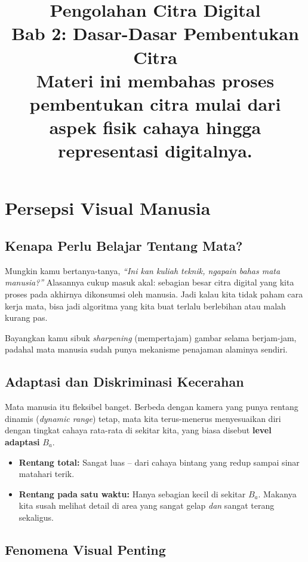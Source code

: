 \documentclass[12pt,a4paper]{article}
\title{
  {\LARGE\bfseries Pengolahan Citra Digital}\\[0.5em]
  {\large Bab 2: Dasar-Dasar Pembentukan Citra}\\[0.8em]
  {\normalsize Materi ini membahas proses pembentukan citra mulai dari aspek fisik cahaya hingga representasi digitalnya.}
}
\author{}
\date{}
\begin{document}
\maketitle
\thispagestyle{fancy}
\tableofcontents
\newpage
 
\section{Persepsi Visual Manusia}
\label{sec:visual}
 
\subsection{Kenapa Perlu Belajar Tentang Mata?}
 
Mungkin kamu bertanya-tanya, \textit{``Ini kan kuliah teknik, ngapain bahas mata manusia?''}
Alasannya cukup masuk akal: sebagian besar citra digital yang kita proses pada akhirnya
dikonsumsi oleh manusia. Jadi kalau kita tidak paham cara kerja mata, bisa jadi algoritma
yang kita buat terlalu berlebihan atau malah kurang pas.
 
Bayangkan kamu sibuk \textit{sharpening} (mempertajam) gambar selama berjam-jam, padahal
mata manusia sudah punya mekanisme penajaman alaminya sendiri.
 
\subsection{Adaptasi dan Diskriminasi Kecerahan}
 
Mata manusia itu fleksibel banget. Berbeda dengan kamera yang punya rentang dinamis
(\textit{dynamic range}) tetap, mata kita terus-menerus menyesuaikan diri dengan tingkat
cahaya rata-rata di sekitar kita, yang biasa disebut \textbf{level adaptasi} $B_a$.
 
\begin{itemize}[leftmargin=*]
  \item \textbf{Rentang total:} Sangat luas -- dari cahaya bintang yang redup sampai
        sinar matahari terik.
  \item \textbf{Rentang pada satu waktu:} Hanya sebagian kecil di sekitar $B_a$. Makanya
        kita susah melihat detail di area yang sangat gelap \textit{dan} sangat terang
        sekaligus.
\end{itemize}
 
\subsection{Fenomena Visual Penting}
 
\end{document}
